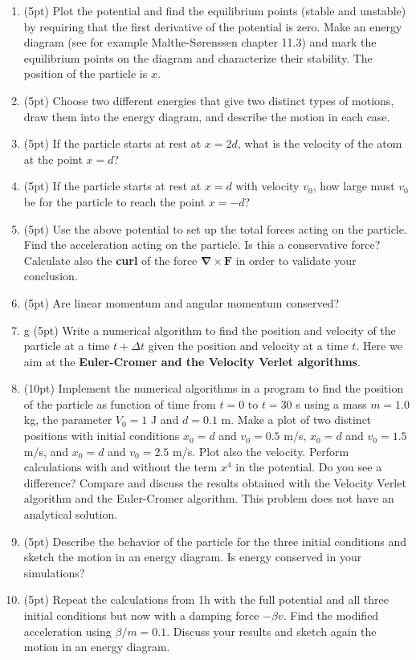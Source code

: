 \documentclass[%
oneside,                 %
final,                   %
10pt]{article}
\begin{document}
\begin{enumerate}
\item (5pt) Plot the potential and find the  equilibrium points (stable and unstable) by requiring that the first derivative of the potential is zero. Make an energy diagram (see for example Malthe-Sørenssen chapter 11.3) and mark the equilibrium points on the diagram and characterize their stability. The position of the particle is $x$. 

\item (5pt) Choose two different energies that give two distinct types of motions, draw them into the energy diagram, and describe the motion in each case.

\item (5pt) If the particle  starts at rest at $x=2d$, what is the velocity of the atom at the point $x=d$?

\item (5pt) If the particle  starts at rest at $x=d$ with velocity $v_0$, how large must $v_0$ be for the  particle to reach the point $x=−d$?

\item (5pt) Use the above potential to set up the total forces acting on the particle.  Find the acceleration acting on the particle. Is this a conservative force? Calculate also the \textbf{curl} of the force  $\bm{\nabla}\times \bm{F}$ in order to validate your conclusion. 

\item (5pt) Are linear momentum and angular momentum conserved? 

\item g (5pt) Write a numerical algorithm to find the position and velocity of the particle at a time $t+\Delta t$ given the position and velocity at a time $t$. Here we aim at the \textbf{Euler-Cromer and the Velocity Verlet algorithms}.   

\item (10pt) Implement the numerical algorithms in a program to find the position of the particle as function of time from $t=0$ to $t=30$ s using a mass  $m=1.0$ kg, the parameter $V_0=1$ J and $d=0.1$ m. Make a plot of two distinct positions with initial conditions $x_0=d$ and $v_0=0.5$ m/s, $x_0=d$ and $v_0=1.5$ m/s, and $x_0=d$ and $v_0=2.5$ m/s. Plot also the velocity.  Perform calculations with and without the term $x^4$ in the potential. Do you see a difference? Compare and discuss the results obtained with the Velocity Verlet algorithm and the Euler-Cromer algorithm. This problem does not have an analytical solution. 

\item (5pt) Describe the behavior of the particle for the three initial conditions  and sketch the motion in an energy diagram. Is energy conserved in your simulations?

\item (5pt) Repeat the calculations from 1h with the full potential and all three initial conditions but now with a damping force $-\beta v$. Find the modified acceleration using $\beta/m=0.1$. Discuss your results and sketch again the motion in an energy diagram.
\end{enumerate}
\end{document}
